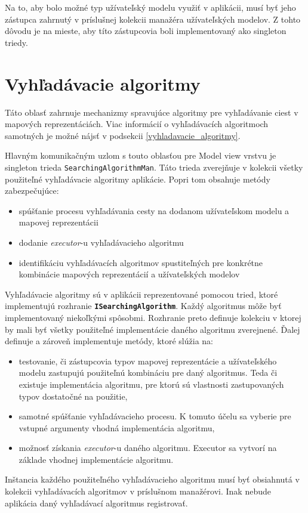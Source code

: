 Na to, aby bolo možné typ užívateľský modelu využiť v aplikácii, musí byť jeho zástupca zahrnutý v príslušnej kolekcii manažéra užívateľských modelov. Z tohto dôvodu je na mieste, aby títo zástupcovia boli implementovaný ako singleton triedy.

\section{Vyhľadávacie algoritmy}

Táto oblasť zahrnuje mechanizmy spravujúce algoritmy pre vyhľadávanie ciest v mapových reprezentáciách. Viac informácií o vyhľadávacích algoritmoch samotných je možné nájsť v podsekcii \ref{vyhladavacie_algoritmy}. 

Hlavným komunikačným uzlom s touto oblasťou pre Model view vrstvu je singleton trieda \texttt{SearchingAlgorithmMan}. Táto trieda zverejňuje v kolekcii všetky použiteľné vyhľadávacie algoritmy aplikácie. Popri tom obsahuje metódy zabezpečujúce: 
\begin{itemize}
    \item spúšťanie procesu vyhľadávania cesty na dodanom užívateľskom modelu a mapovej reprezentácii
    \item dodanie \textit{executor}-u vyhľadávacieho algoritmu
    \item identifikáciu vyhľadávacích algoritmov spustiteľných pre konkrétne kombinácie mapových reprezentácií a užívateľských modelov 
\end{itemize}

\bigskip

Vyhľadávacie algoritmy sú v aplikácii reprezentované pomocou tried, ktoré implementujú rozhranie \textbf{\texttt{ISearchingAlgorithm}}. Každý algoritmus môže byť implementovaný niekoľkými spôsobmi. Rozhranie preto definuje kolekciu v ktorej by mali byť všetky použiteľné implementácie daného algoritmu zverejnené. Ďalej definuje a zároveň implementuje metódy, ktoré slúžia na:
\begin{itemize}
    \item testovanie, či zástupcovia typov mapovej reprezentácie a užívateľského modelu zastupujú použiteľnú kombináciu pre daný algoritmus. Teda či existuje implementácia algoritmu, pre ktorú sú vlastnosti zastupovaných typov dostatočné na použitie, 
    \item samotné spúšťanie vyhľadávacieho procesu. K tomuto účelu sa vyberie pre vstupné argumenty vhodná implementácia algoritmu,
    \item možnosť získania \textit{executor}-u daného algoritmu. Executor sa vytvorí na základe vhodnej implementácie algoritmu.
\end{itemize}
Inštancia každého použiteľného vyhľadávacieho algoritmu musí byť obsiahnutá v kolekcii vyhľadávacích algoritmov v príslušnom manažérovi. Inak nebude aplikácia daný vyhľadávací algoritmus registrovať. 


